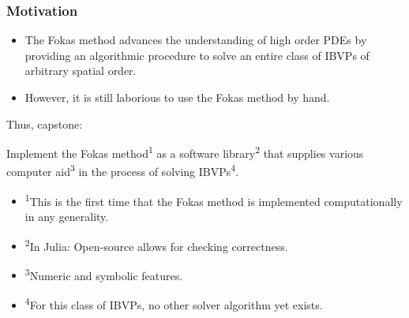 \documentclass{beamer}
\begin{document}
\begin{frame}[t]
    \frametitle{Motivation}
    \begin{itemize}
        \item The Fokas method advances the understanding of high order PDEs by providing an algorithmic procedure to solve an entire class of IBVPs of arbitrary spatial order.
        \item However, it is still laborious to use the Fokas method by hand.
    \end{itemize}
    \medskip
    Thus, capstone:
    \begin{tcolorbox}[colback=white,colframe=gray!40, arc=0pt, outer arc=0pt]
        \begin{center}
            Implement the Fokas method\textsuperscript{1} as a software library\textsuperscript{2} that supplies various computer aid\textsuperscript{3} in the process of solving IBVPs\textsuperscript{4}.
        \end{center}
    \end{tcolorbox}
    \begin{itemize}
        \item[] \textsuperscript{1}This is the first time that the Fokas method is implemented computationally in any generality.
        \item[] \textsuperscript{2}In Julia: Open-source allows for checking correctness.
        \item[] \textsuperscript{3}Numeric and symbolic features.
        \item[] \textsuperscript{4}For this class of IBVPs, no other solver algorithm yet exists.
    \end{itemize}
\end{frame}
\end{document}
